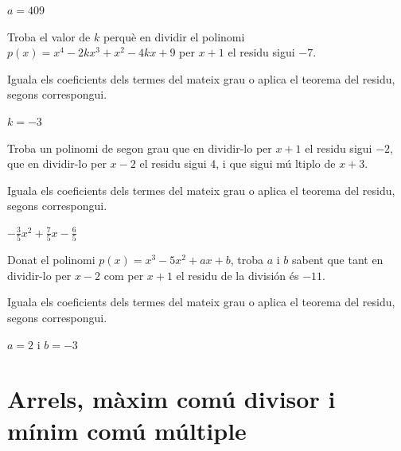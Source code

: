 \begin{solucio}
$a=409$
\end{solucio}

\begin{exercici}
Troba el valor de $k$ perquè en dividir el polinomi $
p(x)=x^{4}-2kx^{3}+x^{2}-4kx+9$ per $x+1$ el residu sigui $-7$.
\end{exercici}
\begin{indicacio}
Iguala els coeficients dels termes del mateix grau o aplica el teorema del residu, segons correspongui.
\end{indicacio}

\begin{solucio}
$k=-3$
\end{solucio}

\begin{exercici}
Troba un polinomi de segon grau que en dividir-lo per $x+1$ el
residu sigui $-2$, que en dividir-lo per $x-2$ el residu sigui $4$, i que sigui mú
ltiplo de $x+3$.
\end{exercici}
\begin{indicacio}
Iguala els coeficients dels termes del mateix grau o aplica el teorema del residu, segons correspongui.
\end{indicacio}

\begin{solucio}
$-\frac{3}{5}x^{2}+\frac{7}{5}x-\frac{6}{5}$
\end{solucio}

\begin{exercici}
Donat el polinomi $p(x)=x^{3}-5x^{2}+ax+b$, troba $a$ i $b$ sabent
que tant en dividir-lo per $x-2$ com per $x+1$ el residu de la división
és $-11$.
\end{exercici}
\begin{indicacio}
Iguala els coeficients dels termes del mateix grau o aplica el teorema del residu, segons correspongui.
\end{indicacio}

\begin{solucio}
$a=2$ i $b=-3$
\end{solucio}

\section{Arrels, màxim comú divisor i mínim comú múltiple}

